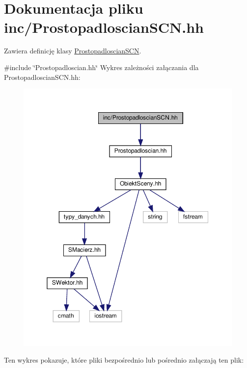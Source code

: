 \hypertarget{ProstopadloscianSCN_8hh}{}\section{Dokumentacja pliku inc/\+Prostopadloscian\+S\+CN.hh}
\label{ProstopadloscianSCN_8hh}


Zawiera definicję klasy \hyperlink{classProstopadloscianSCN}{Prostopadloscian\+S\+CN}.  


{\ttfamily \#include \char`\"{}Prostopadloscian.\+hh\char`\"{}}\newline
Wykres zależności załączania dla Prostopadloscian\+S\+C\+N.\+hh\+:\nopagebreak
\begin{figure}[H]
\begin{center}
\leavevmode
\includegraphics[width=350pt]{ProstopadloscianSCN_8hh__incl}
\end{center}
\end{figure}
Ten wykres pokazuje, które pliki bezpośrednio lub pośrednio załączają ten plik\+:\nopagebreak
